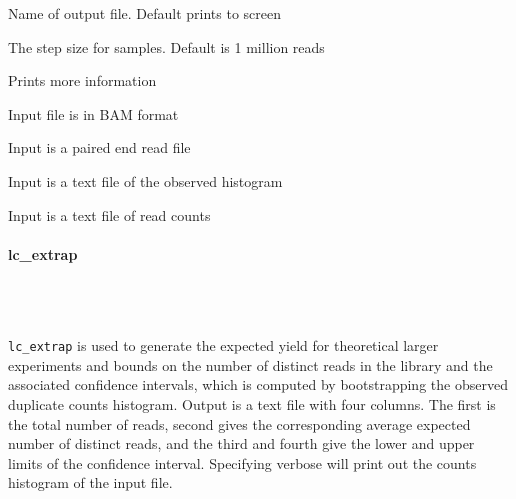 \documentclass[11pt, titlepage]{article}
\newcommand{\fn}[1]{\texttt{#1}}
\begin{document}
\begin{description}[style=multiline,leftmargin=6cm,font=\ttfamily]
\item[\begingroup \fontsize{9pt}{12pt}\selectfont-o, -output\endgroup] Name of output file. Default prints to screen
\item[\begingroup \fontsize{9pt}{12pt}\selectfont-s, -step\endgroup] The step size for samples. Default is 1 million reads
\item[\begingroup \fontsize{9pt}{12pt}\selectfont-v -verbose\endgroup] Prints more information
\item[\begingroup \fontsize{9pt}{12pt}\selectfont-B, -bam\endgroup] Input file is in BAM format
\item[\begingroup \fontsize{9pt}{12pt}\selectfont-P, -pe\endgroup] Input is a paired end read file
\item[\begingroup \fontsize{9pt}{12pt}\selectfont-H, -hist\endgroup] Input is a text file of the observed histogram
\item[\begingroup \fontsize{9pt}{12pt}\selectfont-V, -vals\endgroup] Input is a text file of read counts
\end{description}

\newpage

\paragraph{lc\_extrap}~\\~\\[-.2cm]
\label{sec:librarycomplexity}

\fn{lc\_extrap} is used to generate
the expected yield for theoretical larger
experiments and bounds on the number of distinct
reads in the library and the associated confidence
intervals, which is computed by bootstrapping the observed duplicate counts histogram.
Output is a text file with four columns.  The
first is the total number of reads, second
gives the corresponding average
expected number of distinct reads, and the
third and fourth give the lower and
upper
limits of the confidence interval.
Specifying verbose will print out the counts histogram
of the input file.
\end{document}
